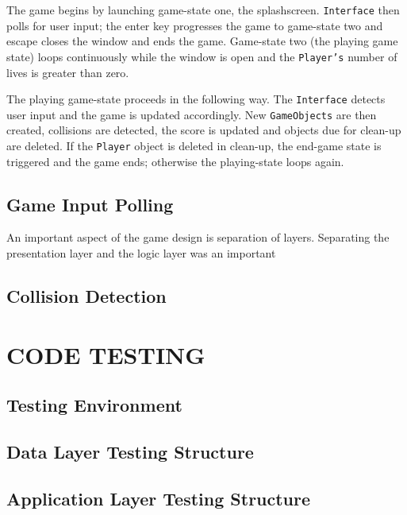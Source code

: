 \documentclass[10pt,twocolumn]{witseiepaper}
\begin{document}
The game begins by launching game-state one, the splashscreen. \texttt{Interface} then polls for user input; the enter key progresses the game to game-state two and escape closes the window and ends the game. Game-state two (the playing game state) loops continuously while the window is open and the \texttt{Player's} number of lives is greater than zero. 

The playing game-state proceeds in the following way. The \texttt{Interface} detects user input and the game is updated accordingly. New \texttt{GameObjects} are then created, collisions are detected, the score is updated and objects due for clean-up are deleted. If the \texttt{Player} object is deleted in clean-up, the end-game state is triggered and the game ends; otherwise the playing-state loops again.

\subsection{Game Input Polling}

An important aspect of the game design is separation of layers. Separating the presentation layer and the logic layer was an important 


\subsection{Collision Detection}



\section{CODE TESTING}

\subsection{Testing Environment}

\subsection{Data Layer Testing Structure}

\subsection{Application Layer Testing Structure}

\end{document}
